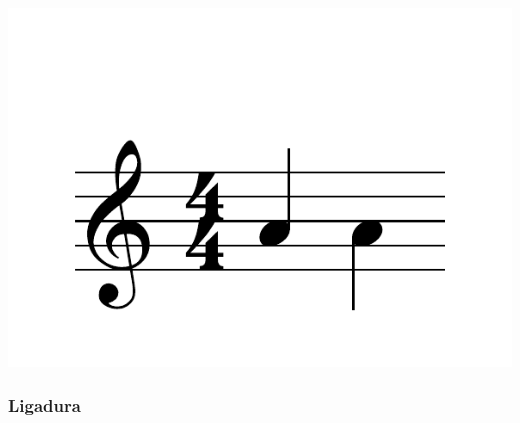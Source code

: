\documentclass{article}
\begin{document}
\includegraphics[scale=0.5]{figures_tests/pdf/skern/stemdirection1.pdf}

\subsubsection{Ligadura}
\end{document}
